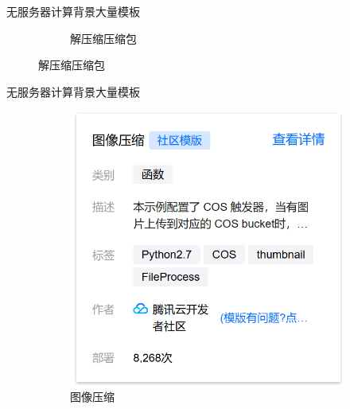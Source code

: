 \documentclass[aspectratio=169]{beamer}
\begin{document}
\begin{frame}{无服务器计算背景}{大量模板}
\begin{figure}
\begin{subfigure}{0.45\textwidth}
      \caption{解压缩压缩包}
    \end{subfigure}
  \end{figure}
\end{frame}

\begin{frame}{无服务器计算背景}{大量模板}
  \begin{figure}
    \begin{subfigure}{0.45\textwidth}
      \centering
      \includegraphics[height=0.7\textheight]{img/serverless-background/scf-template-3.png}
      \caption{图像压缩}
    \end{subfigure}
    \begin{subfigure}{0.45\textwidth}
      \centering

\end{subfigure}
\end{figure}
\end{frame}
\end{document}
